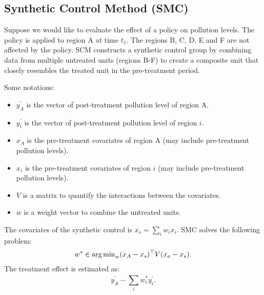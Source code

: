 \subsection{Synthetic Control Method (SMC)}
    Suppose we would like to evaluate the effect of a policy on pollution levels. 
    The policy is applied to region A at time $t_1$. 
    The regions B, C, D, E and F are not affected by the policy. 
    SCM constructs a synthetic control group by combining data from multiple untreated units (regions B-F) to create a composite unit that closely resembles the treated unit in the pre-treatment period. 

    Some notations:
        \begin{itemize}
            \item $y^\prime_{A}$ is the vector of post-treatment pollution level of region A.
            \item $y^\prime_{i}$ is the vector of post-treatment pollution level of region $i$.
            \item $x_A$ is the pre-treatment covariates of region A (may include pre-treatment pollution levels).
            \item $x_i$ is the pre-treatment covariates of region $i$ (may include pre-treatment pollution levels).
            \item $V$ is a matrix to quantify the interactions between the covariates.
            \item $w$ is a weight vector to combine the untreated units. 
        \end{itemize}
    The covariates of the synthetic control is $x_s = \sum_{i}^{}{w_i x_i}$.
    SMC solves the following problem:
        \begin{equation}
            \begin{aligned}
                 w^\ast \in \operatorname{arg\,min}_{w} (x_A - x_s)^\top V (x_a - x_s).
            \end{aligned}
        \end{equation}
    The treatment effect is estimated as:
        \begin{equation}
            y^\prime_A - \sum_{i}^{}{w^\ast_i y^\prime_i}.
        \end{equation}